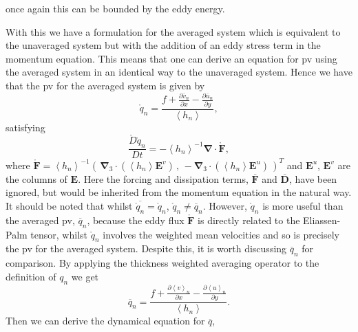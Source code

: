 \documentclass[12pt,a4paper]{report}
\newcommand*\thkmean[1]{\overline{#1}}
\newcommand*\nthkmean[1]{\left\langle{#1}\right\rangle}
\newcommand*\spec[1]{\mathring{#1}}
\newcommand*{\partialdiff}[2][{}]{\frac{\partial #1}{\partial #2}}
\begin{document}
    once again this
    can be bounded by the eddy energy.
    
    With this we have a formulation for the 
    averaged system which is equivalent to the
    unaveraged system but with the addition of an
    eddy stress term in the momentum equation.
    This means that one can derive an equation for \gls{pv} using the averaged system
    in an identical way to the unaveraged 
    system. Hence we have that the \gls{pv} for
    the averaged system is given by 
    \begin{equation}
    \spec{q}_{n} =
    \frac{f+\partialdiff[\thkmean{v}_{n}]{x}-\partialdiff[\thkmean{u}_{n}]{y}}
    {\nthkmean{h_{n}}},
    \end{equation} 
    satisfying
    \begin{equation}
    \frac{\spec{D}\spec{q}_{n}}{D t} 
    =   -\nthkmean{h_{n}}^{-1}
    \boldsymbol{\nabla}
    \cdot\boldsymbol{\spec{F}},
    \label{avpveq}
    \end{equation} 
    where $
    \boldsymbol{\spec{F}}
    =   \nthkmean{h_{n}}^{-1}\left( \,
    \boldsymbol{\nabla}_{3}
    \cdot(\nthkmean{h_{n}}
    \boldsymbol{E}^{v}) \, , \,
    - \boldsymbol{\nabla}_{3}
    \cdot(\nthkmean{h_{n}}
    \boldsymbol{E}^{u}) \, \right)^{T}  $ and $\boldsymbol{E}^{u}$,  $\boldsymbol{E}^{v}$ are the
    columns of  $\boldsymbol{E}$. Here the forcing and dissipation terms, $\thkmean{
    	\boldsymbol{F}}$ and $\thkmean{
    	\boldsymbol{D}}$, have been ignored, but
    would be inherited from the momentum
    equation in the natural way. It should be noted that whilst $\thkmean{\spec{q}_{n}} = \spec{q}_{n}$, $\spec{q}_{n} \neq \thkmean{q}_{n}$.  However,
    $\spec{q}_{n}$ is 
    more useful than the averaged \gls{pv}, $\thkmean{q}_{n}$, because the eddy flux $
    \boldsymbol{\spec{F}} $ is directly related to the Eliassen-Palm tensor, whilst  $\spec{q}_{n}$ involves
    the weighted mean velocities and so is precisely the \gls{pv} for the averaged system. 
    Despite this, it is worth discussing $\thkmean{q}_{n}$ for 
    comparison. By applying the thickness weighted averaging operator to the 
    definition of $q_{n}$ we get 
    \begin{equation}
    \thkmean{q}_{n} =
    \frac{f+\partialdiff[\nthkmean{v}_{n}]{x}-\partialdiff[\nthkmean{u}_{n}]{y}}
    {\nthkmean{h_{n}}}.
    \end{equation} 
    Then we can derive the dynamical equation for
    $ \thkmean{q}$,
\end{document}
